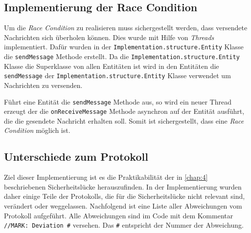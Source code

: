 \subsection{Implementierung der Race Condition}
Um die \textit{Race Condition} zu realisieren muss sichergestellt werden, dass versendete Nachrichten sich überholen können.
Dies wurde mit Hilfe von \textit{Threads} implementiert.
Dafür wurden in der \lstinline{Implementation.structure.Entity} Klasse die \lstinline{sendMessage} Methode erstellt.
Da die \lstinline{Implementation.structure.Entity} Klasse die Superklasse von allen Entitäten ist wird in den Entitäten die \lstinline{sendMessage} der \lstinline{Implementation.structure.Entity} Klasse verwendet um Nachrichten zu versenden.

Führt eine Entität die \lstinline{sendMessage} Methode aus, so wird ein neuer Thread erzeugt der die \lstinline{onReceiveMessage} Methode asynchron auf der Entität ausführt, die die gesendete Nachricht erhalten soll.
Somit ist sichergestellt, dass eine \textit{Race Condition} möglich ist.


\subsection{Unterschiede zum Protokoll}
Ziel dieser Implementierung ist es die Praktikabilität der in \cref{chap:4} beschriebenen Sicherheitslücke herauszufinden.
In der Implementierung wurden daher einige Teile der Protokolls, die für die Sicherheitslücke nicht relevant sind, verändert oder weggelassen.
Nachfolgend ist eine Liste aller Abweichungen vom Protokoll aufgeführt.
Alle Abweichungen sind im Code mit dem Kommentar \lstinline{//MARK: Deviation #} versehen.
Das \lstinline{#} entspricht der Nummer der Abweichung.

